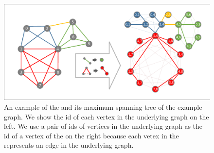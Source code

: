 \begin{figure}[ht]
    \centering
    \includegraphics[width=0.8\linewidth, trim={0.1cm 0.1cm, 0.1cm, 0.1cm}, clip]{./figures/bottom_level.pdf}
    \caption{An example of the \inducedgraph{} and its maximum spanning tree of the example graph. We show the id of each vertex in the underlying graph on the left. We use a pair of ids of vertices in the underlying graph as the id of a vertex of the \inducedgraph{} on the right because each vetex in the \inducedgraph{} represents an edge in the underlying graph. }
    \label{fig:\inducedgraph{}}
\end{figure}

%


